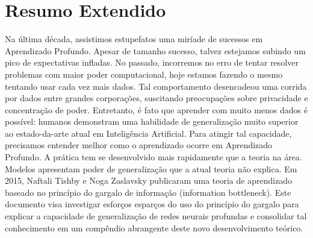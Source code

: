\begin{otherlanguage}{brazilian}
  \chapter*{Resumo Extendido}
  Na última década, assistimos estupefatos uma miríade de sucessos em Aprendizado Profundo. Apesar de tamanho sucesso, talvez estejamos subindo um pico de expectativas infladas. No passado, incorremos no erro de tentar resolver problemas com maior poder computacional, hoje estamos fazendo o mesmo tentando usar cada vez mais dados. Tal comportamento desencadeou uma corrida por dados entre grandes corporações, suscitando preocupações sobre privacidade e concentração de poder. Entretanto, é fato que aprender com muito menos dados é possível: humanos demonstram uma habilidade de generalização muito superior ao estado-da-arte atual em Inteligência Artificial. Para atingir tal capacidade, precisamos entender melhor como o aprendizado ocorre em Aprendizado Profundo.  A prática tem se desenvolvido mais rapidamente que a teoria na área. Modelos apresentam poder de generalização que a atual teoria não explica. Em 2015, Naftali Tishby e Noga Zaslavsky publicaram uma teoria de aprendizado baseado no princípio do gargalo de informação (information bottleneck). Este documento visa investigar esforços esparços do uso do princípio do gargalo para explicar a capacidade de generalização de redes neurais profundas e consolidar tal conhecimento em um compêndio abrangente deste novo desenvolvimento teórico.
  \end{otherlanguage}
